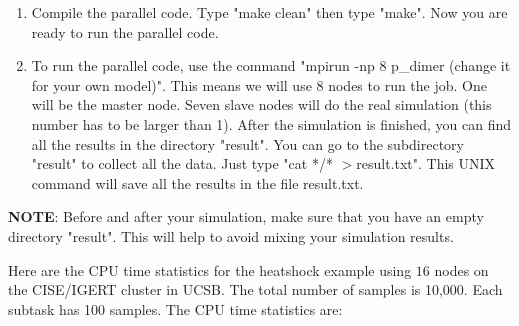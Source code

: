 \documentclass[12pt]{article}
\begin{document}
\begin{enumerate}
\begin{enumerate}
    {\it
         Example: \\
           EXE     = p\_dimer
    }
      \item Change parameters in the OBJS to the file name you use.

    { \it
         Example: \\
         OBJS = parallel.o DimerStats.o ProblemDefinition.o
    }
    \item Change other names for your model.
    \end{enumerate}

\item Compile the parallel code. Type "make clean" then type "make". Now you are ready to run
    the parallel code.

\item To run the parallel code, use the command "mpirun -np 8 p\_dimer (change it for your own model)".
      This means we will use 8 nodes to run the job. One will be the master node. Seven slave
    nodes will do the real simulation (this number has to be larger than 1).
   After the simulation is finished, you can find all the results in the directory "result".
   You can go to the subdirectory "result" to collect all the data. Just type "cat */* $>$result.txt".
    This UNIX command will save all the results in the file result.txt. \\
\end{enumerate}

{\bf NOTE}: Before and after your simulation, make sure
    that you have an empty directory "result". This will help to avoid mixing your simulation
    results.

Here are the CPU time statistics for the heatshock example using $16$ nodes on the CISE/IGERT cluster
in UCSB. The total number of samples is 10,000. Each subtask has 100 samples. The
CPU time statistics are:
\end{document}

